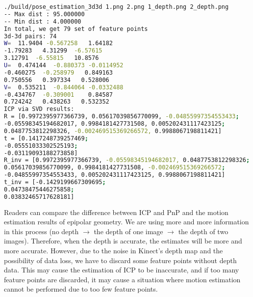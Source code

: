 \begin{lstlisting}[language=sh,caption=Terminal output:]
./build/pose_estimation_3d3d 1.png 2.png 1_depth.png 2_depth.png
-- Max dist : 95.000000 
-- Min dist : 4.000000 
In total, we get 79 set of feature points
3d-3d pairs: 74
W=  11.9404 -0.567258   1.64182
-1.79283   4.31299  -6.57615
3.12791  -6.55815   10.8576
U=  0.474144  -0.880373 -0.0114952
-0.460275  -0.258979   0.849163
0.750556   0.397334   0.528006
V=  0.535211  -0.844064 -0.0332488
-0.434767  -0.309001    0.84587
0.724242   0.438263   0.532352
ICP via SVD results: 
R = [0.9972395977366739, 0.05617039856770099, -0.04855997354553433;
-0.05598345194682017, 0.9984181427731508, 0.005202431117423125;
0.0487753812298326, -0.002469515369266572, 0.9988067198811421]
t = [0.1417248739257469;
-0.05551033302525193;
-0.03119093188273858]
R_inv = [0.9972395977366739, -0.05598345194682017, 0.0487753812298326;
0.05617039856770099, 0.9984181427731508, -0.002469515369266572;
-0.04855997354553433, 0.005202431117423125, 0.9988067198811421]
t_inv = [-0.1429199667309695;
0.04738475446275858;
0.03832465717628181]
\end{lstlisting}

Readers can compare the difference between ICP and PnP and the motion estimation results of epipolar geometry. We are using more and more information in this process (no depth $\rightarrow$ the depth of one image $\rightarrow$ the depth of two images). Therefore, when the depth is accurate, the estimates will be more and more accurate. However, due to the noise in Kinect's depth map and the possibility of data loss, we have to discard some feature points without depth data. This may cause the estimation of ICP to be inaccurate, and if too many feature points are discarded, it may cause a situation where motion estimation cannot be performed due to too few feature points.

